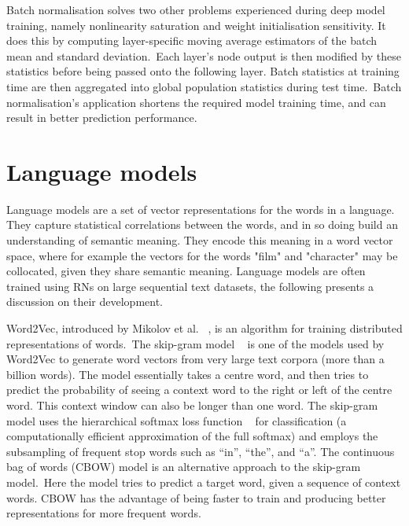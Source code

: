\noindent Batch normalisation solves two other problems experienced during deep model training, namely nonlinearity saturation and weight initialisation sensitivity. It does this by computing layer-specific moving average estimators of the batch mean and standard deviation.\ Each layer's node output is then modified by these statistics before being passed onto the following layer. Batch statistics at training time are then aggregated into global population statistics during test time.\ Batch normalisation's application shortens the required model training time, and can result in better prediction performance. 



\section{Language models}

\noindent Language models are a set of vector representations for the words in a language. They capture statistical correlations between the words, and in so doing build an understanding of semantic meaning. They encode this meaning in a word vector space, where for example the vectors for the words "film" and "character" may be collocated, given they share semantic meaning. Language models are often trained using RNs on large sequential text datasets, the following presents a discussion on their development. \par

\noindent Word2Vec, introduced by Mikolov et al. \unskip~\citep{mikolov2013distributed}, is an algorithm for training distributed representations of words.\ The skip-gram model \unskip ~\citep{mikolov2013efficient} is one of the models used by Word2Vec to generate word vectors from very large text corpora (more than a billion words). The model essentially takes a centre word, and then tries to predict the probability of seeing a context word to the right or left of the centre word. This context window can also be longer than one word. The skip-gram model uses the hierarchical softmax loss function \unskip~\citep{morin2005hierarchical} for classification (a computationally efficient approximation of the full softmax) and employs the subsampling of frequent stop words such as “in”, “the”, and “a”. The continuous bag of words (CBOW) model is an alternative approach to the skip-gram model.\ Here the model tries to predict a target word, given a sequence of context words. CBOW has the advantage of being faster to train and producing better representations for more frequent words. \par

